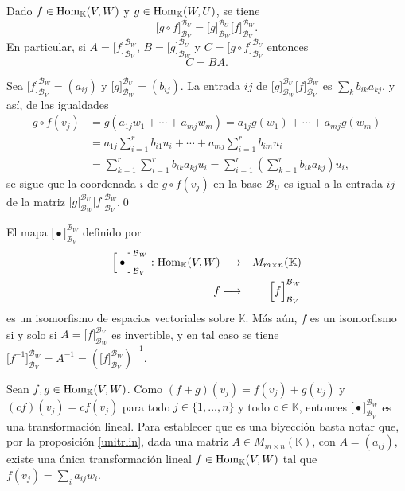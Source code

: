 \begin{prop}\label{compmult}
Dado $f\in\operatorname{Hom}_{\mathbb{K}}(V,W)$ y $g\in\operatorname{Hom}_{\mathbb{K}}(W,U)$, se tiene
$$
\Big[ g\circ f \Big]^{\mathcal{B}_U}_{\mathcal{B}_V}=\Big[ g \Big]^{\mathcal{B}_U}_{\mathcal{B}_W}\Big[ f \Big]^{\mathcal{B}_W}_{\mathcal{B}_V}.
$$
En particular, si $A=\Big[ f \Big]^{\mathcal{B}_W}_{\mathcal{B}_V}$, $B=\Big[ g \Big]^{\mathcal{B}_U}_{\mathcal{B}_W}$ y $C=\Big[ g\circ f \Big]^{\mathcal{B}_U}_{\mathcal{B}_V}$ entonces
$$C=BA.$$
\end{prop}

\dem Sea $\Big[ f \Big]^{\mathcal{B}_W}_{\mathcal{B}_V}=(a_{ij})$ y $\Big[ g \Big]^{\mathcal{B}_U}_{\mathcal{B}_W}=(b_{ij})$.
La entrada $ij$ de $\Big[ g \Big]^{\mathcal{B}_U}_{\mathcal{B}_W}\Big[ f \Big]^{\mathcal{B}_W}_{\mathcal{B}_V}$ es $\sum_k b_{ik}a_{kj}$, y as\'i, de las igualdades
\begin{align*}
g\circ f(v_j) &= g(a_{1j}w_1+\cdots+a_{mj}w_m)=a_{1j}g(w_1)+\cdots+a_{mj}g(w_m)\\
 & = a_{1j}\sum_{i=1}^rb_{i1}u_i+\cdots+a_{mj}\sum_{i=1}^rb_{im}u_i\\
 & = \sum_{k=1}^r\sum_{i=1}^rb_{ik}a_{kj}u_i=\sum_{i=1}^r\left(\sum_{k=1}^r b_{ik}a_{kj}\right)u_i,
\end{align*}
se sigue que la coordenada $i$ de $g\circ f(v_j)$ en la base $\mathcal{B}_U$ es igual a la entrada $ij$ de la matriz $\Big[ g \Big]^{\mathcal{B}_U}_{\mathcal{B}_W}\Big[ f \Big]^{\mathcal{B}_W}_{\mathcal{B}_V}$.\qed

\begin{prop}\label{homym}
El mapa $\Big[ \bullet \Big]^{\mathcal{B}_W}_{\mathcal{B}_V}$ definido por
\begin{eqnarray*}
\Big[ \bullet \Big]^{\mathcal{B}_W}_{\mathcal{B}_V}: \operatorname{Hom}_{\mathbb{K}}(V,W) & \longrightarrow & M_{m\times n}(\mathbb{K})\\
f & \longmapsto & \Big[ f \Big]^{\mathcal{B}_W}_{\mathcal{B}_V}
\end{eqnarray*}
es un isomorfismo de espacios vectoriales sobre $\mathbb{K}$. M\'as a\'un, $f$ es un isomorfismo si y solo si $A=\Big[ f \Big]_{\mathcal{B}_W}^{\mathcal{B}_V}$ es invertible, y en tal caso se tiene $\Big[ f^{-1} \Big]^{\mathcal{B}_W}_{\mathcal{B}_V}=A^{-1}=\left(\Big[ f \Big]_{\mathcal{B}_V}^{\mathcal{B}_W}\right)^{-1}$.
\end{prop}

\dem Sean $f,g\in\operatorname{Hom}_{\mathbb{K}}(V,W)$. Como $(f+g)(v_j)=f(v_j)+g(v_j)$ y $(cf)(v_j)=cf(v_j)$ para todo $j\in\{1,\ldots,n\}$ y todo $c\in \mathbb{K}$, entonces  $\Big[ \bullet \Big]^{\mathcal{B}_W}_{\mathcal{B}_V}$ es una transformaci\'on lineal. Para establecer que es una biyecci\'on basta notar que, por la proposici\'on \ref{unitrlin}, dada una matriz $A\in M_{m\times n}(\mathbb{K})$, con $A=(a_{ij})$, existe una \'unica transformaci\'on lineal $f\in \operatorname{Hom}_{\mathbb{K}}(V,W)$ tal que $f(v_j)=\sum_i a_{ij}w_i$.

